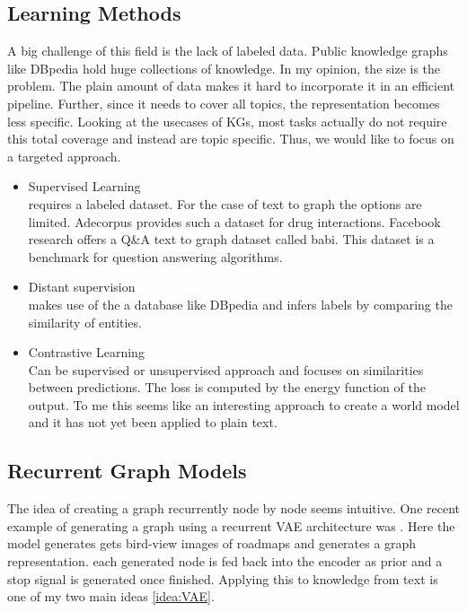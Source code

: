 \subsection{Learning Methods}
A big challenge of this field is the lack of labeled data. Public knowledge graphs like DBpedia hold huge collections of knowledge. In my opinion, the size is the problem. The plain amount of data makes it hard to incorporate it in an efficient pipeline. Further, since it needs to cover all topics, the representation becomes less specific.
Looking at the usecases of KGs, most tasks actually do not require this total coverage and instead are topic specific. Thus, we would like to focus on a targeted approach.
\begin{itemize}
    \item Supervised Learning\\ requires a labeled dataset. For the case of text to graph the options are limited. Adecorpus provides such a dataset for drug interactions. Facebook research offers a Q&A text to graph dataset called babi. This dataset is a benchmark for question answering algorithms. 
    \\
    \item Distant supervision\\ makes use of the a database like DBpedia and infers labels by comparing the similarity of entities.
    \\
    \item Contrastive Learning\\
    Can be supervised or unsupervised approach and focuses on similarities between predictions. The loss is computed by the energy function of the output. To me this seems like an interesting approach to create a world model \cite{kipf_contrastive_2020} and it has not yet been applied to plain text.
\end{itemize}


\subsection{Recurrent Graph Models}
The idea of creating a graph recurrently node by node seems intuitive. One recent example of generating a graph using a recurrent VAE architecture was \cite{belli_image-conditioned_2019}. Here the model generates gets bird-view images of roadmaps and generates a graph representation. each generated node is fed back into the encoder as prior and a stop signal is generated once finished.
Applying this to knowledge from text is one of my two main ideas \ref{idea:VAE}.

